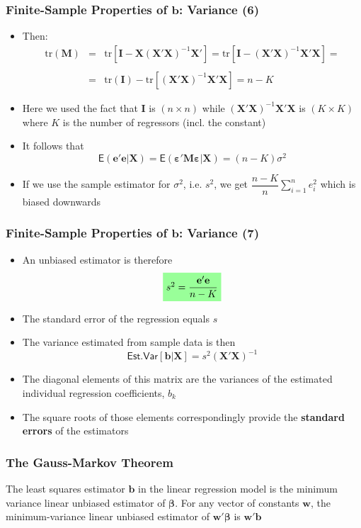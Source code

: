 \documentclass[10pt]{beamer}
\newcommand{\E}{\mathsf{E}}
\newcommand{\Est}{\mathsf{Est.Var}}
\newcommand{\tr}{\mathrm{tr}}
\theoremstyle{definition}
\begin{document}
\begin{frame}[fragile]
\frametitle{Finite-Sample Properties of $\mathbf{b}$: Variance (6)}
\begin{itemize}
	\item Then:
	\[
		\begin{array}{lcl}
			\tr(\mathbf{M}) & = & \tr[\mathbf{I - X(X'X)}^{-1}\mathbf{X'}] = \tr[\mathbf{I - (X'X)}^{-1}\mathbf{X'X}] = \\
			\quad\\
			& = & \tr(\mathbf{I}) - \tr[\mathbf{(X'X)}^{-1}\mathbf{X'X}] = n - K
		\end{array}
	\]
	\item Here we used the fact that $ \mathbf{I} $ is $ (n\times n) $ while $ \mathbf{(X'X)}^{-1}\mathbf{X'X}$ is $ (K \times K) $ where $ K $ is the number of regressors (incl. the constant)
	\item It follows that
	\[
			\E(\mathbf{e'e}|\mathbf{X}) = \E(\boldsymbol\varepsilon'\mathbf{M}\boldsymbol\varepsilon|\mathbf{X}) = (n - K) \sigma^{2}
	\]
	\item If we use the sample estimator for $ \sigma^{2} $, i.e. $ s^{2} $, we get $\dfrac{n - K}{n}\sum_{i=1}^{n}e_{i}^{2}$ which is biased downwards
\end{itemize}
\end{frame}

\begin{frame}[fragile]
\frametitle{Finite-Sample Properties of $\mathbf{b}$: Variance (7)}
\begin{itemize}
	\item An unbiased estimator is therefore
	\[
	\tikz[baseline]{
		\node[fill=green!40,anchor=base] (t1)
		{$s^{2} = \dfrac{\mathbf{e'e}}{n - K}$};
	}
	\]
	\item The standard error of the regression equals $ s $
	\item The variance estimated from sample data is then
	\[
		\Est[\mathbf{b|X}] = s^{2}(\mathbf{X'X})^{-1}
	\]
	\item The diagonal elements of this matrix are the variances of the estimated individual regression coefficients, $ b_{k} $
	\item The square roots of those elements correspondingly provide the \textbf{standard errors} of the estimators
\end{itemize}	
\end{frame}

\begin{frame}[fragile]
\frametitle{The Gauss-Markov Theorem}
	\begin{theorem}
		The least squares estimator $ \mathbf{b} $ in the linear regression model is the minimum variance linear unbiased estimator of $\boldsymbol\beta$. For any vector of constants $ \mathbf{w} $, the minimum-variance linear unbiased estimator of $ \mathbf{w}'\boldsymbol\beta $ is $ \mathbf{w'b} $
	\end{theorem}
\end{frame}
\end{document}
